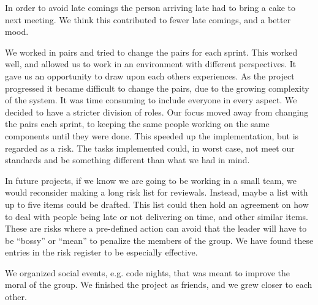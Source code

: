 In order to avoid late comings the person arriving late had to bring a
cake to next meeting. We think this contributed to fewer late comings,
and a better mood.

We worked in pairs and tried to change the pairs for each sprint. This
worked well, and allowed us to work in an environment with different
perspectives. It gave us an opportunity to draw upon each others
experiences. As the project progressed it became difficult to change
the pairs, due to the growing complexity of the system. It was time
consuming to include everyone in every aspect. We decided to have a
stricter division of roles. Our focus moved away from changing the
pairs each sprint, to keeping the same people working on the same
components until they were done. This speeded up the implementation,
but is regarded as a risk. The tasks implemented could, in worst case,
not meet our standards and be something different than what we had in
mind. 

In future projects, if we know we are going to be working in a small
team, we would reconsider making a long risk list for reviewals.
Instead, maybe a list with up to five items could be drafted. This list
could then hold an agreement on how to deal with people being late or
not delivering on time, and other similar items. These are risks where
a pre-defined action can avoid that the leader will have to be
``bossy'' or ``mean'' to penalize the members of
the group. We have found these entries in the risk register to be
especially effective. 

We organized social events, e.g. code nights, that was meant to improve
the moral of the group. We finished the project as friends, and we grew
closer to each other.